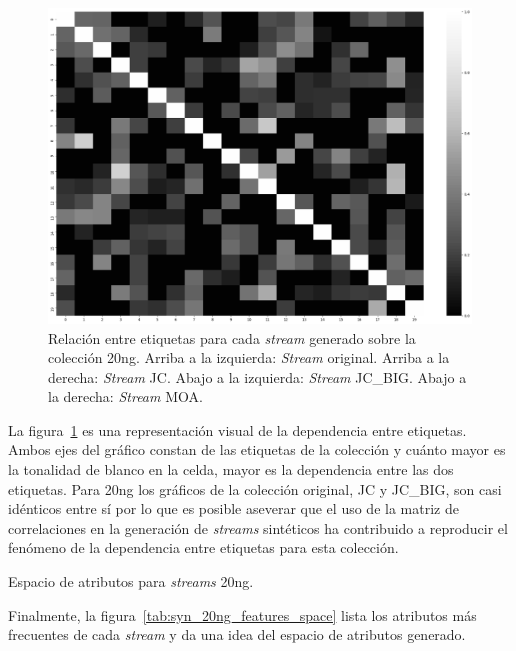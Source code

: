 \begin{figure}[htbp]
	\includegraphics[width=\linewidth / 2]{figures/experiments/syn/20ng/MOA_relationship_graph.png}
	\caption[Relación entre etiquetas para cada \textit{stream} generado sobre
		la colección 20ng.]{Relación entre etiquetas para cada \textit{stream} generado sobre
		la colección 20ng. Arriba a la izquierda: \textit{Stream} original. Arriba a la
		derecha: \textit{Stream} JC. Abajo a la izquierda: \textit{Stream}
		JC\_BIG. Abajo a la derecha: \textit{Stream} MOA.}
	\label{fig:syn_20ng_label_relationship}
\end{figure}

La figura~\ref{fig:syn_20ng_label_relationship} es una representación visual de
la dependencia entre etiquetas. Ambos ejes del gráfico constan de las etiquetas
de la colección y cuánto mayor es la tonalidad de blanco en la celda, mayor es
la dependencia entre las dos etiquetas. Para 20ng los gráficos de la colección
original, JC y JC\_BIG, son casi idénticos entre sí por lo que es posible
aseverar que el uso de la matriz de correlaciones en la generación de
\textit{streams} sintéticos ha contribuido a reproducir el fenómeno de la
dependencia entre etiquetas para esta colección.

\begin{table}[htbp]
	\centering
	\begin{adjustbox}{max width=\textwidth}
		
	\end{adjustbox}
	\caption{Espacio de atributos para \textit{streams} 20ng.}
	\label{tab:syn_20ng_features_space}
\end{table}

Finalmente, la figura~\ref{tab:syn_20ng_features_space} lista los atributos más
frecuentes de cada \textit{stream} y da una idea del espacio de atributos
generado.

